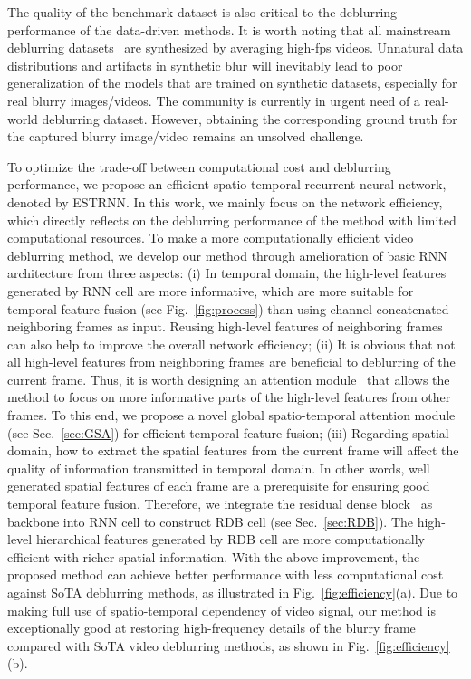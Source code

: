 \documentclass[twocolumn]{svjour3}          \smartqed  \usepackage{graphicx}
\begin{document}
The quality of the benchmark dataset is also critical to the deblurring performance of the data-driven methods. It is worth noting that all mainstream deblurring datasets~\cite{nah2017deep, su2017deep, nah2019ntire} are synthesized by averaging high-fps videos. Unnatural data distributions and artifacts in synthetic blur will inevitably lead to poor generalization of the models that are trained on synthetic datasets, especially for real blurry images/videos. The community is currently in urgent need of a real-world deblurring dataset. However, obtaining the corresponding ground truth for the captured blurry image/video remains an unsolved challenge.

To optimize the trade-off between computational cost and deblurring performance, we propose an efficient spatio-temporal recurrent neural network, denoted by ESTRNN. In this work, we mainly focus on the network efficiency, which directly reflects on the deblurring performance of the method with limited computational resources. To make a more computationally efficient video deblurring method, we develop our method through amelioration of basic RNN architecture from three aspects: (i) In temporal domain, the high-level features generated by RNN cell are more informative, which are more suitable for temporal feature fusion (see Fig.~\ref{fig:process}) than using channel-concatenated neighboring frames as input. Reusing high-level features of neighboring frames can also help to improve the overall network efficiency; (ii) It is obvious that not all high-level features from neighboring frames are beneficial to deblurring of the current frame. Thus, it is worth designing an attention module~\cite{bahdanau2014neural} that allows the method to focus on more informative parts of the high-level features from other frames. To this end, we propose a novel global spatio-temporal attention module (see Sec.~\ref{sec:GSA}) for efficient temporal feature fusion; (iii) Regarding spatial domain, how to extract the spatial features from the current frame will affect the quality of information transmitted in temporal domain. In other words, well generated spatial features of each frame are a prerequisite for ensuring good temporal feature fusion. Therefore, we integrate the residual dense block~\cite{zhang2018residual} as backbone into RNN cell to construct RDB cell (see Sec.~\ref{sec:RDB}). The high-level hierarchical features generated by RDB cell are more computationally efficient with richer spatial information. With the above improvement, the proposed method can achieve better performance with less computational cost against SoTA deblurring methods, as illustrated in Fig.~\ref{fig:efficiency}(a). Due to making full use of spatio-temporal dependency of video signal, our method is exceptionally good at restoring high-frequency details of the blurry frame compared with SoTA video deblurring methods, as shown in Fig.~\ref{fig:efficiency}(b).
\end{document}
